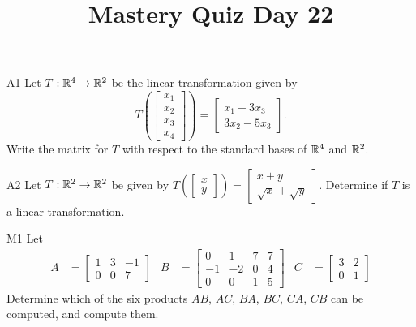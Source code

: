 \documentclass{sbgLAquiz}
\title{Mastery Quiz Day 22 }
\begin{document}
\begin{problem}{A1}
Let $T: \mathbb{R}^4 \rightarrow \mathbb{R}^2$ be the linear transformation given by $$T\left(\begin{bmatrix} x_1 \\ x_2 \\ x_3 \\ x_4 \end{bmatrix} \right) = \begin{bmatrix} x_1+3x_3 \\ 3x_2-5x_3 \end{bmatrix}.$$ Write the matrix for $T$ with respect to the standard bases of $\mathbb{R}^4$ and $\mathbb{R}^2$.
\end{problem}

\begin{problem}{A2}
Let $T: \mathbb{R}^2 \rightarrow \mathbb{R}^2$ be given by $T\left(\begin{bmatrix}x \\ y  \end{bmatrix} \right) = \begin{bmatrix} x+y \\ \sqrt{x}+\sqrt{y} \end{bmatrix}$.  Determine if $T$ is a linear transformation.
\end{problem}
\newpage

\begin{problem}{M1}
Let
\begin{align*}
A &= \begin{bmatrix} 1 & 3 & -1  \\ 0 & 0 & 7  \end{bmatrix} & B &= \begin{bmatrix} 0 & 1 & 7 & 7 \\ -1 & -2 & 0 & 4 \\ 0 & 0 & 1 & 5 \end{bmatrix} & C&=\begin{bmatrix} 3 & 2 \\ 0 & 1 \end{bmatrix}
\end{align*}
Determine which of the six products $AB$, $AC$, $BA$, $BC$, $CA$, $CB$ can be computed, and compute them.
\end{problem}
\end{document}

